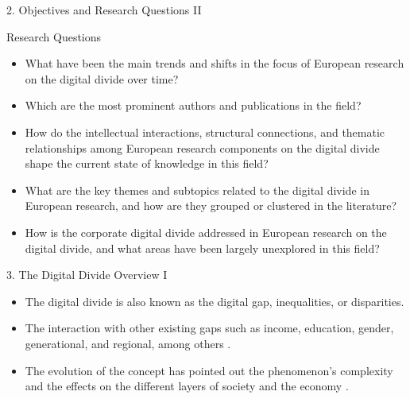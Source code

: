 \documentclass[
  ignorenonframetext,
]{beamer}
\providecommand{\tightlist}{%
  \setlength{\itemsep}{0pt}\setlength{\parskip}{0pt}}
\begin{document}
\begin{frame}{2. Objectives and Research Questions II}
\protect\hypertarget{objectives-and-research-questions-ii}{}
\begin{block}{Research Questions}
\protect\hypertarget{research-questions}{}
\begin{itemize}
\item
  What have been the main trends and shifts in the focus of European
  research on the digital divide over time?
\item
  Which are the most prominent authors and publications in the field?
\item
  How do the intellectual interactions, structural connections, and
  thematic relationships among European research components on the
  digital divide shape the current state of knowledge in this field?
\item
  What are the key themes and subtopics related to the digital divide in
  European research, and how are they grouped or clustered in the
  literature?
\item
  How is the corporate digital divide addressed in European research on
  the digital divide, and what areas have been largely unexplored in
  this field?
\end{itemize}
\end{block}
\end{frame}

\begin{frame}{3. The Digital Divide Overview I}
\protect\hypertarget{the-digital-divide-overview-i}{}
\begin{itemize}
\tightlist
\item
  The digital divide is also known as the digital gap, inequalities, or
  disparities.
\item
  The interaction with other existing gaps such as income, education,
  gender, generational, and regional, among others \citep{ragnedda2017}.
\item
  The evolution of the concept has pointed out the phenomenon's
  complexity and the effects on the different layers of society and the
  economy \citep{vandijk2003, ragnedda2017, shakina2021}.
\end{itemize}
\end{frame}
\end{document}
